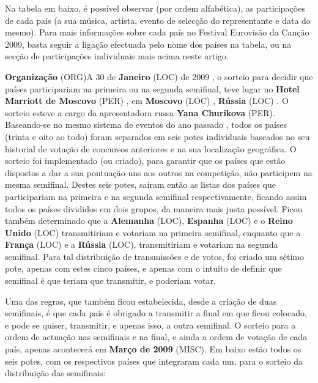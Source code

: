 \documentclass[12pt,a4paper]{article}
\begin{document}
Na tabela em baixo, é possível observar (por ordem alfabética), as participações de cada país (a sua música, artista, evento de selecção do representante e data do mesmo). Para mais informações sobre cada país no Festival Eurovisão da Canção 2009, basta seguir a ligação efectuada pelo nome dos países na tabela, ou na secção de participações individuais mais acima neste artigo.



\textbf{Organização} (ORG)A 30 de \textbf{Janeiro} (LOC) de 2009 , o sorteio para decidir que países participariam na primeira ou na segunda semifinal, teve lugar no \textbf{Hotel Marriott de Moscovo} (PER) , em \textbf{Moscovo} (LOC) , \textbf{Rússia} (LOC) . O sorteio esteve a cargo da apresentadora russa \textbf{Yana Churikova} (PER). Baseando-se no mesmo sistema de eventos do ano passado , todos os países (trinta e oito ao todo) foram separados em seis potes individuais baseados no seu historial de votação de concursos anteriores e na sua localização geográfica. O sorteio foi implementado (ou criado), para garantir que os países que estão dispostos a dar a sua pontuação uns aos outros na competição, não participem na mesma semifinal. Destes seis potes, saíram então as listas dos países que participariam na primeira e na segunda semifinal respectivamente, ficando assim todos os países divididos em dois grupos, da maneira mais justa possível. Ficou também determinado que a \textbf{Alemanha} (LOC), \textbf{Espanha} (LOC) e o \textbf{Reino Unido} (LOC) transmitiriam e votariam na primeira semifinal, enquanto que a \textbf{França} (LOC) e a \textbf{Rússia} (LOC), transmitiriam e votariam na segunda semifinal. Para tal distribuição de transmissões e de votos, foi criado um sétimo pote, apenas com estes cinco países, e apenas com o intuito de definir que semifinal é que teriam que transmitir, e poderiam votar.

Uma das regras, que também ficou estabelecida, desde a criação de duas semifinais, é que cada país é obrigado a transmitir a final em que ficou colocado, e pode se quiser, transmitir, e apenas isso, a outra semifinal. O sorteio para a ordem de actuação nas semifinais e na final, e ainda a ordem de votação de cada país, apenas acontecerá em \textbf{Março de 2009} (MISC). Em baixo estão todos os seis potes, com os respectivos países que integraram cada um, para o sorteio da distribuição das semifinais:
\end{document}
